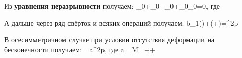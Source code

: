 Из \textbf{уравнения неразрывности} получаем:
\beq
\varphi_0+\rho_0+\rho_0\pmb{\nabla}\cdot{}+\rho_0\varphi_0=0,
\eeq
где
\beq
{}\equiv\pmb{\nabla}\cdot{}
\eeq

А дальше через ряд свёрток и всяких операций получаем:
\beq
b_1(\pmb{\varepsilon})+\left(+\right)=\pmb{\nabla}^2p
\eeq

В осесимметричном случае при условии отсутствия деформации на бесконечности получаем:
\beq
{}=a\pmb{\nabla}^2p,
\eeq
где
\beq
a= M=++
\eeq



